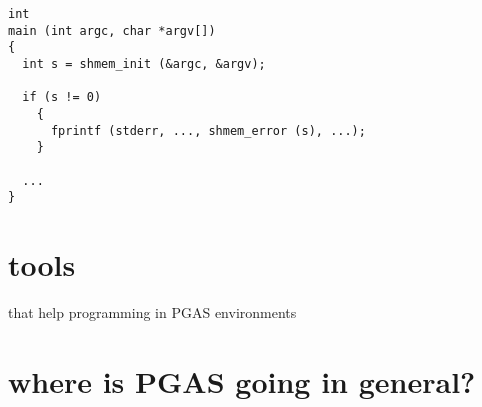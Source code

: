 \begin{lstlisting}[language=OSH2+C]
int
main (int argc, char *argv[])
{
  int s = shmem_init (&argc, &argv);

  if (s != 0)
    {
      fprintf (stderr, ..., shmem_error (s), ...);
    }

  ...
}
\end{lstlisting}

\section{tools}

that help programming in PGAS environments

\section{where is PGAS going in general?}
